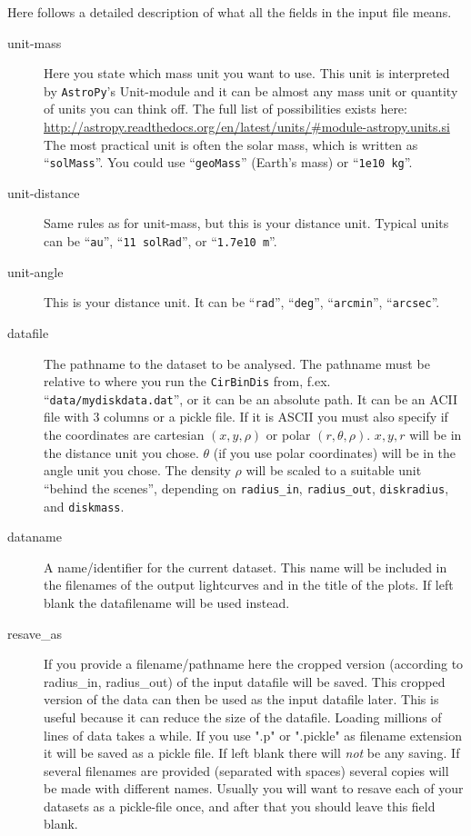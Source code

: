 \documentclass[a4paper, 12pt, english, titlepage]{article}
\newcommand{\sname}{\texttt{CirBinDis}\xspace}
\begin{document}
    Here follows a detailed description of what all the fields in the input file means.

    \begin{description}
        \item[unit-mass]
            Here you state which mass unit you want to use. This unit is interpreted by \texttt{AstroPy}'s Unit-module and it can be almost any mass unit or quantity of units you can think off. The full list of possibilities exists here:
            \url{http://astropy.readthedocs.org/en/latest/units/#module-astropy.units.si}
            The most practical unit is often the solar mass, which is written as ``\texttt{solMass}''.
            You could use ``\texttt{geoMass}'' (Earth's mass) or ``\texttt{1e10 kg}''.
        \item[unit-distance]
            Same rules as for unit-mass, but this is your distance unit. Typical units can be ``\texttt{au}'', ``\texttt{11 solRad}'', or ``\texttt{1.7e10 m}''.
        \item[unit-angle]
            This is your distance unit. It can be ``\texttt{rad}'', ``\texttt{deg}'', ``\texttt{arcmin}'', ``\texttt{arcsec}''.
        \item[datafile]
            The pathname to the dataset to be analysed. The pathname must be relative to where you run the \sname from, f.ex. ``\texttt{data/mydiskdata.dat}'', or it can be an absolute path. It can be an ACII file with 3 columns or a pickle file. If it is ASCII you must also specify if the coordinates are cartesian $(x,y,\rho)$ or polar $(r,\theta,\rho)$. $x,y,r$ will be in the distance unit you chose. $\theta$ (if you use polar coordinates) will be in the angle unit you chose. The density $\rho$ will be scaled to a suitable unit ``behind the scenes'', depending on \texttt{radius\_in}, \texttt{radius\_out}, \texttt{diskradius}, and \texttt{diskmass}.
        \item[dataname]
            A name/identifier for the current dataset. This name will be included
            in the filenames of the output lightcurves and in the title of the
            plots. If left blank the datafilename will be used instead.
        \item[resave\_as]
            If you provide a filename/pathname here the cropped version (according to radius\_in, radius\_out) of the input datafile will be saved. This cropped version of the data can then be used as the input datafile later. This is useful because it can reduce the size of the datafile. Loading millions of lines of data takes a while. If you use ".p" or ".pickle" as filename extension it will be saved as a pickle file. If left blank there will \emph{not} be any saving. If several filenames are provided (separated with spaces) several copies will be made with different names. Usually you will want to resave each of your datasets as a pickle-file once, and after that you should leave this field blank.

\end{description}
\end{document}
